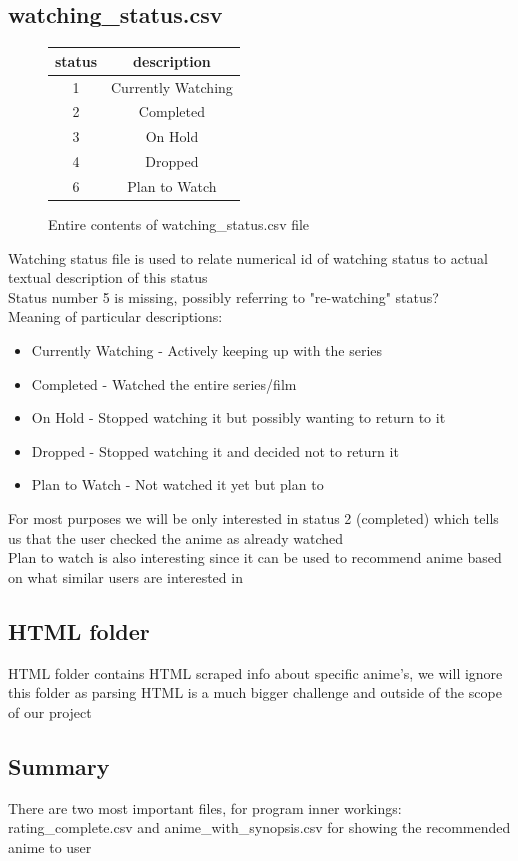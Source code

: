 \subsection{watching\_status.csv}
\label{watchingStatus}
\begin{figure}[h]
\caption{Entire contents of watching\_status.csv file}
\centering
\begin{tabular}{| c | c |}
\hline
status & description \\ 
\hline
1 & Currently Watching \\
\hline
2 & Completed \\
\hline
3 & On Hold \\
\hline
4 & Dropped \\
\hline
6 & Plan to Watch \\
\hline
\end{tabular}
\end{figure}

Watching status file is used to relate numerical id of watching status to actual textual description of this status \\ 
Status number 5 is missing, possibly referring to "re-watching" status? \\ 
Meaning of particular descriptions:
\begin{itemize}
    \item Currently Watching - Actively keeping up with the series
    \item Completed - Watched the entire series/film
    \item On Hold - Stopped watching it but possibly wanting to return to it
    \item Dropped - Stopped watching it and decided not to return it 
    \item Plan to Watch  - Not watched it yet but plan to
\end{itemize}
For most purposes we will be only interested in status 2 (completed) which tells us that the user checked the anime as already watched \\ 
Plan to watch is also interesting since it can be used to recommend anime based on what similar users are interested in
\subsection{HTML folder}
HTML folder contains HTML scraped info about specific anime's, we will ignore this folder as parsing HTML is a much bigger challenge and outside of the scope of our project
\subsection{Summary}
There are two most important files, for program inner workings: rating\_complete.csv and anime\_with\_synopsis.csv for showing the recommended anime to user


